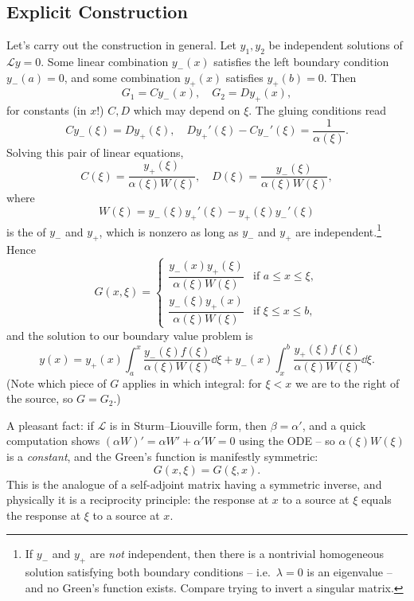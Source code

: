 \subsection{Explicit Construction}

Let's carry out the construction in general. Let $y_1, y_2$ be independent solutions of $\mathcal{L} y = 0$. Some linear combination $y_-(x)$ satisfies the left boundary condition $y_-(a) = 0$, and some combination $y_+(x)$ satisfies $y_+(b) = 0$. Then
$$
G_1 = C y_-(x), \quad G_2 = D y_+(x),
$$
for constants (in $x$!) $C, D$ which may depend on $\xi$. The gluing conditions read
$$
C y_-(\xi) = D y_+(\xi), \quad D y_+'(\xi) - C y_-'(\xi) = \frac{1}{\alpha(\xi)}.
$$
Solving this pair of linear equations,
$$
C(\xi) = \frac{y_+(\xi)}{\alpha(\xi) W(\xi)}, \quad D(\xi) = \frac{y_-(\xi)}{\alpha(\xi) W(\xi)},
$$
where
$$
W(\xi) = y_-(\xi) y_+'(\xi) - y_+(\xi) y_-'(\xi)
$$
is the  of $y_-$ and $y_+$, which is nonzero as long as $y_-$ and $y_+$ are independent.\footnote{If $y_-$ and $y_+$ are \emph{not} independent, then there is a nontrivial homogeneous solution satisfying both boundary conditions -- i.e.\ $\lambda = 0$ is an eigenvalue -- and no Green's function exists. Compare trying to invert a singular matrix.} Hence
$$
G(x, \xi) = \begin{cases}
    \dfrac{y_-(x) y_+(\xi)}{\alpha(\xi) W(\xi)} &\mbox{if } a \leq x \leq \xi, \\[2ex]
    \dfrac{y_-(\xi) y_+(x)}{\alpha(\xi) W(\xi)} &\mbox{if } \xi \leq x \leq b,
\end{cases}
$$
and the solution to our boundary value problem is
$$
y(x) = y_+(x) \int_a^x \frac{y_-(\xi) f(\xi)}{\alpha(\xi) W(\xi)} \dd \xi + y_-(x) \int_x^b \frac{y_+(\xi) f(\xi)}{\alpha(\xi) W(\xi)} \dd \xi.
$$
(Note which piece of $G$ applies in which integral: for $\xi < x$ we are to the right of the source, so $G = G_2$.)

A pleasant fact: if $\mathcal{L}$ is in Sturm--Liouville form, then $\beta = \alpha'$, and a quick computation shows $(\alpha W)' = \alpha W' + \alpha' W = 0$ using the ODE -- so $\alpha(\xi) W(\xi)$ is a \emph{constant}, and the Green's function is manifestly symmetric:
$$
G(x, \xi) = G(\xi, x).
$$
This is the analogue of a self-adjoint matrix having a symmetric inverse, and physically it is a reciprocity principle: the response at $x$ to a source at $\xi$ equals the response at $\xi$ to a source at $x$.

